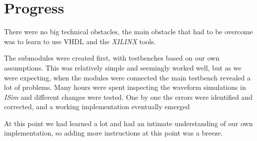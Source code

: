 \section{Progress}
There were no big technical obstacles,
the main obstacle that had to be overcome was to learn to use VHDL and the \textit{XILINX} tools.

The submodules were created first,
with testbenches based on our own assumptions.
This was relatively simple and seemingly worked well,
but as we were expecting,
when the modules were connected the main testbench revealed a lot of problems.
Many hours were spent inspecting the waveform simulations in \textit{ISim} and different changes were tested.
One by one the errors were identified and corrected,
and a working implementation eventually emerged

At this point we had learned a lot and had an intimate understanding of our own implementation,
so adding more instructions at this point was a breeze.
